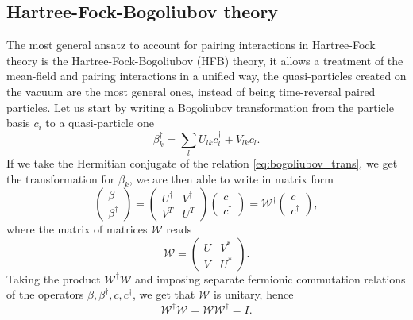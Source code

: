 \subsection{Hartree-Fock-Bogoliubov theory}
The most general ansatz to account for pairing interactions in Hartree-Fock theory is the Hartree-Fock-Bogoliubov (HFB) theory, it allows a treatment of the mean-field and pairing interactions in a unified way, the quasi-particles created on the vacuum are the most general ones, instead of being time-reversal paired particles.
Let us start by writing a Bogoliubov transformation from the particle basis $c_i$ to a quasi-particle one 
\begin{equation}
    \label{eq:bogoliubov_trans}
    \beta_k^\dagger = \sum_l U_{lk} c_l^\dagger + V_{lk} c_l.
\end{equation}
If we take the Hermitian conjugate of the relation \eqref{eq:bogoliubov_trans}, we get the transformation for $\beta_k$, we are then able to write in matrix form
\begin{equation}
    \label{eq:bogoliubov_trans_mat}
    \begin{pmatrix}
    \beta\\
    \beta^\dagger
    \end{pmatrix}
    =\begin{pmatrix}
        U^\dagger & V^\dagger \\
        V^T & U^T
    \end{pmatrix}
    \begin{pmatrix}
        c\\
        c^\dagger
    \end{pmatrix}
    =\mathcal W^\dagger \begin{pmatrix}
        c\\
        c^\dagger
    \end{pmatrix},
\end{equation}
where the matrix of matrices $\mathcal W$ reads
\begin{equation}
    \label{eq:bogoliubov_mat}
    \mathcal W = \begin{pmatrix}
        U & V^*\\
        V & U^*
    \end{pmatrix}.
\end{equation}
Taking the product $\mathcal W^\dagger \mathcal W$ and imposing separate fermionic commutation relations of the operators $\beta, \beta^\dagger, c, c^\dagger$, we get that $\mathcal W$ is unitary, hence
\begin{equation}
    \mathcal W^\dagger \mathcal W = \mathcal W \mathcal W^\dagger =  I.
\end{equation}
